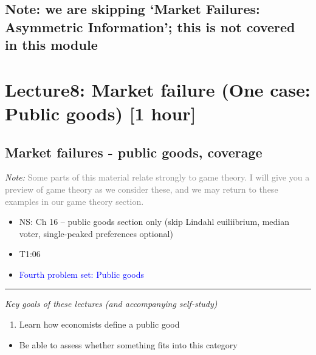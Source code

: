 \documentclass[]{article}
\providecommand{\tightlist}{%
  \setlength{\itemsep}{0pt}\setlength{\parskip}{0pt}}
\begin{document}
\hypertarget{note-we-are-skipping-market-failures-asymmetric-information-this-is-not-covered-in-this-module}{%
\subsection{Note: we are skipping `Market Failures: Asymmetric Information'; this is not covered in this module}\label{note-we-are-skipping-market-failures-asymmetric-information-this-is-not-covered-in-this-module}}

\hypertarget{lecture8-market-failure-one-case-public-goods-1-hour}{%
\section{Lecture8: Market failure (One case: Public goods) {[}1 hour{]}}\label{lecture8-market-failure-one-case-public-goods-1-hour}}

\hypertarget{market-failures---public-goods-coverage}{%
\subsection{Market failures - public goods, coverage}\label{market-failures---public-goods-coverage}}

\emph{Note:} \textcolor{gray}{Some parts of this material relate strongly to game theory. I will give you a preview of game theory as we consider these, and we may return to these examples in our game theory section.}

\begin{itemize}
\item
  NS: Ch 16 -- public goods section only (skip Lindahl euiliibrium, median voter, single-peaked preferences optional)
\item
  T1:06
\item
  \textcolor{blue}{Fourth problem set: Public goods }
\end{itemize}

\begin{center}\rule{0.5\linewidth}{\linethickness}\end{center}

\emph{Key goals of these lectures (and accompanying self-study)}

\begin{enumerate}
\def\labelenumi{\arabic{enumi}.}
\tightlist
\item
  Learn how economists define a public good
\end{enumerate}

\begin{itemize}
\tightlist
\item
  Be able to assess whether something fits into this category
\end{itemize}
\end{document}
